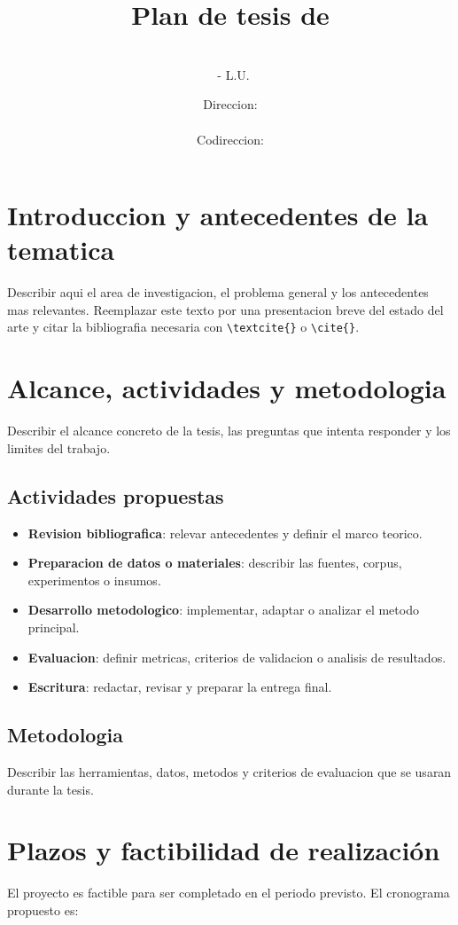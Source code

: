 \documentclass[a4paper,11pt,titlepage]{article}
\title{Plan de tesis de \tesisCarrera{\Huge \\ \tesisTitulo} }
\author{\tesisAutor\\{\small \tesisEmail\ - L.U. \tesisLU}}
\date{Direccion: \tesisDirector \\{\small \tesisDirectorEmail}~\vspace{0.2cm}\\ Codireccion: \tesisCodirector \\{\small \tesisCodirectorEmail}}
\begin{document}
 \maketitle

 
\section*{Introduccion y antecedentes de la tematica}

Describir aqui el area de investigacion, el problema general y los antecedentes mas relevantes. Reemplazar este texto por una presentacion breve del estado del arte y citar la bibliografia necesaria con \verb|\textcite{}| o \verb|\cite{}|.


\section*{Alcance, actividades y metodologia}

Describir el alcance concreto de la tesis, las preguntas que intenta responder y los limites del trabajo.

\subsection*{Actividades propuestas}

\begin{itemize}
    \item \textbf{Revision bibliografica}: relevar antecedentes y definir el marco teorico.
    \item \textbf{Preparacion de datos o materiales}: describir las fuentes, corpus, experimentos o insumos.
    \item \textbf{Desarrollo metodologico}: implementar, adaptar o analizar el metodo principal.
    \item \textbf{Evaluacion}: definir metricas, criterios de validacion o analisis de resultados.
    \item \textbf{Escritura}: redactar, revisar y preparar la entrega final.
\end{itemize}

\subsection*{Metodologia}
Describir las herramientas, datos, metodos y criterios de evaluacion que se usaran durante la tesis.

\section*{Plazos y factibilidad de realización}
El proyecto es factible para ser completado en el periodo previsto. El cronograma propuesto es:
\end{document}
